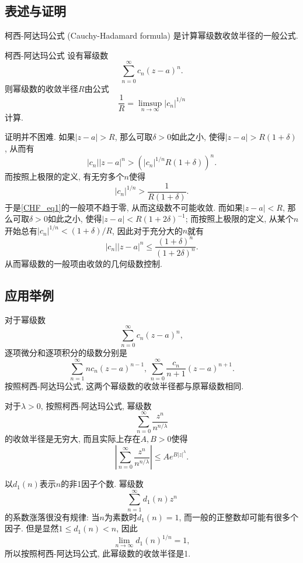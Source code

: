 
\subsection{表述与证明}

柯西-阿达玛公式 (Cauchy-Hadamard formula) 是计算幂级数收敛半径的一般公式.

\begin{theorem}{柯西-阿达玛公式}
设有幂级数
\begin{equation}\label{CHF_eq1}
\sum_{n=0}^\infty c_n(z-a)^n.
\end{equation}
则幂级数的收敛半径$R$由公式
$$
\frac{1}{R}=\limsup_{n\to\infty}|c_n|^{1/n}
$$
计算.
\end{theorem}
证明并不困难. 如果$|z-a|>R$, 那么可取$\delta>0$如此之小, 使得$|z-a|>R(1+\delta)$, 从而有
$$
|c_n||z-a|^n>(|c_n|^{1/n}R(1+\delta))^n.
$$
而按照上极限的定义, 有无穷多个$n$使得
$$
|c_n|^{1/n}>\frac{1}{R(1+\delta)}.
$$
于是\autoref{CHF_eq1}的一般项不趋于零, 从而这级数不可能收敛. 而如果$|z-a|<R$, 那么可取$\delta>0$如此之小, 使得$|z-a|<R(1+2\delta)^{-1}$; 而按照上极限的定义, 从某个$n$开始总有$|c_n|^{1/n}<(1+\delta)/R$, 因此对于充分大的$n$就有
$$
|c_n||z-a|^n\leq\frac{(1+\delta)^n}{(1+2\delta)^n}.
$$
从而幂级数的一般项由收敛的几何级数控制.

\subsection{应用举例}
对于幂级数
$$
\sum_{n=0}^\infty c_n(z-a)^n,
$$
逐项微分和逐项积分的级数分别是
$$
\sum_{n=1}^\infty nc_n(z-a)^{n-1},\,
\sum_{n=0}^\infty \frac{c_n}{n+1}(z-a)^{n+1}.
$$
按照柯西-阿达玛公式, 这两个幂级数的收敛半径都与原幂级数相同.

对于$\lambda>0$, 按照柯西-阿达玛公式, 幂级数
$$
\sum_{n=0}^\infty\frac{z^n}{n^{n/\lambda}}
$$
的收敛半径是无穷大, 而且实际上存在$A,B>0$使得
$$
\left|\sum_{n=0}^\infty\frac{z^n}{n^{n/\lambda}}\right|
\leq Ae^{B|z|^\lambda}.
$$

以$d_1(n)$表示$n$的非1因子个数. 幂级数
$$
\sum_{n=1}^\infty d_1(n)z^n
$$
的系数涨落很没有规律: 当$n$为素数时$d_1(n)=1$, 而一般的正整数却可能有很多个因子. 但是显然$1\leq d_1(n)<n$, 因此
$$
\lim_{n\to\infty}d_1(n)^{1/n}=1,
$$
所以按照柯西-阿达玛公式, 此幂级数的收敛半径是1.